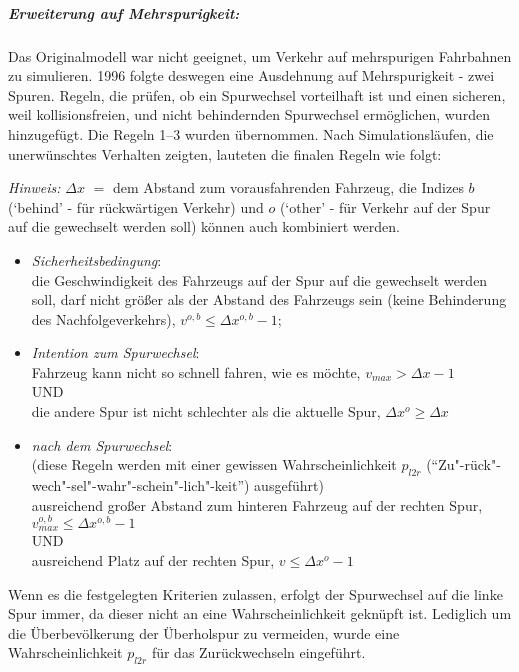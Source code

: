 \subparagraph{Erweiterung auf Mehrspurigkeit:}

Das Originalmodell war nicht geeignet, um Verkehr auf mehrspurigen Fahrbahnen zu simulieren. 
1996 folgte deswegen eine Ausdehnung auf Mehrspurigkeit \cite{multi-lane} - zwei Spuren. 
Regeln, die prüfen, ob ein Spurwechsel vorteilhaft ist und einen sicheren, weil kollisionsfreien, und nicht behindernden Spurwechsel ermöglichen, wurden hinzugefügt. Die Regeln 1--3 wurden übernommen. Nach Simulationsläufen, die unerwünschtes Verhalten zeigten, lauteten die finalen Regeln wie folgt:

\textit{Hinweis:} $\Delta x$ $\widehat{=}$ dem Abstand zum vorausfahrenden Fahrzeug, die Indizes $b$ (\enquote*{behind} - für rückwärtigen Verkehr) und $o$ (\enquote*{other} - für Verkehr auf der Spur auf die gewechselt werden soll) können auch kombiniert werden. 

\begin{itemize}
	\item \textit{Sicherheitsbedingung}: 
	\\	
	die Geschwindigkeit des Fahrzeugs auf der Spur auf die gewechselt werden soll, darf nicht größer als der Abstand des Fahrzeugs sein (keine Behinderung des Nachfolgeverkehrs), $v^{o,b} \leq \Delta x^{o,b}-1$;
	\item \textit{Intention zum Spurwechsel}: 
	\\
	Fahrzeug kann nicht so schnell fahren, wie es möchte, $v_{max} > \Delta x-1$ \\
	UND\\
	die andere Spur ist nicht schlechter als die aktuelle Spur, $\Delta x^{o} \geq \Delta x$
	\item \textit{nach dem Spurwechsel}: 
	\\
	(diese Regeln werden mit einer gewissen Wahrscheinlichkeit $p_{l2r}$ (\enquote{Zu"-rück"-wech"-sel"-wahr"-schein"-lich"-keit}) ausgeführt) \\
	ausreichend großer Abstand zum hinteren Fahrzeug auf der rechten Spur, $v^{o,b}_{max} \leq \Delta x^{o,b}-1$ \\
	UND \\
	ausreichend Platz auf der rechten Spur, $v \leq \Delta x^{o}-1$
\end{itemize}

Wenn es die festgelegten Kriterien zulassen, erfolgt der Spurwechsel auf die linke Spur immer, da dieser nicht an eine Wahrscheinlichkeit geknüpft ist.
Lediglich um die Überbevölkerung der Überholspur zu vermeiden, wurde eine Wahrscheinlichkeit $p_{l2r}$ für das Zurückwechseln eingeführt.

